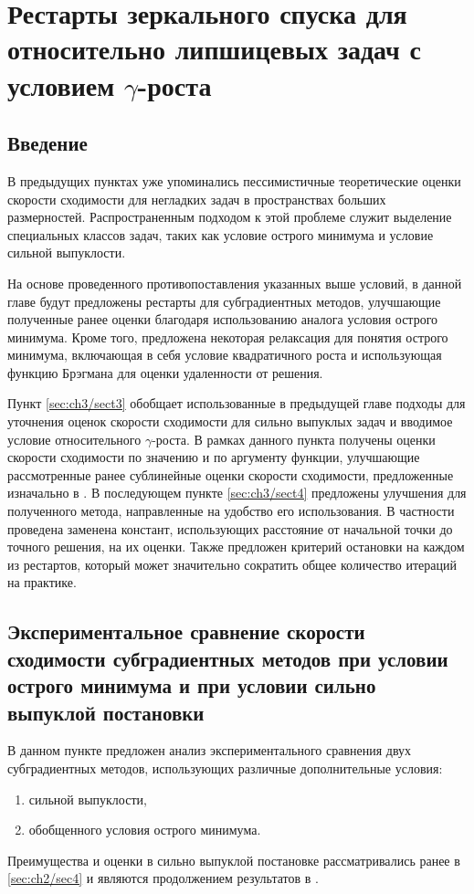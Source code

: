 \chapter{Рестарты зеркального спуска для относительно липшицевых задач с условием $\gamma$-роста}\label{ch:ch3}

\section{Введение}\label{sec:ch3/sect1}

    В предыдущих пунктах уже упоминались пессимистичные теоретические оценки скорости сходимости для негладких задач в пространствах больших размерностей. Распространенным подходом к этой проблеме служит выделение специальных классов задач, таких как условие острого минимума \cite{6, 1} и условие сильной выпуклости. 

    На основе проведенного противопоставления указанных выше условий, в данной главе будут предложены рестарты для субградиентных методов, улучшающие полученные ранее оценки благодаря использованию аналога условия острого минимума.  Кроме того, предложена некоторая релаксация для понятия острого минимума, включающая в себя условие квадратичного роста и использующая функцию Брэгмана для оценки удаленности от решения. 
    
    Пункт \ref{sec:ch3/sect3} обобщает использованные в предыдущей главе подходы для уточнения оценок скорости сходимости для сильно выпуклых задач и вводимое условие относительного $\gamma$-роста. В рамках данного пункта получены оценки скорости сходимости по значению и по аргументу функции, улучшающие рассмотренные ранее сублинейные оценки скорости сходимости, предложенные изначально в \cite{Bach_2012}. В последующем пункте \ref{sec:ch3/sect4} предложены улучшения для полученного метода, направленные на удобство его использования. В частности проведена заменена констант, использующих расстояние от начальной точки до точного решения, на их оценки. Также предложен критерий остановки на каждом из рестартов, который может значительно сократить общее количество итераций на практике.

 \section{Экспериментальное сравнение скорости сходимости субградиентных методов при условии острого минимума и при условии сильно выпуклой постановки}  \label{sec:ch3/sec2}

    В данном пункте предложен анализ экспериментального сравнения двух субградиентных методов, использующих различные дополнительные условия:
    \begin{enumerate}
        \item сильной выпуклости,
        \item обобщенного условия острого минимума.
    \end{enumerate}
    Преимущества и оценки в сильно выпуклой постановке рассматривались ранее в \ref{sec:ch2/sec4} и являются продолжением результатов в \cite{Bach_2012}.

